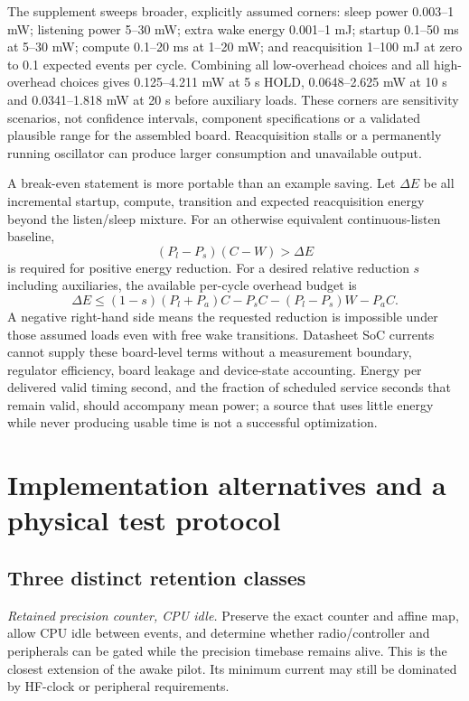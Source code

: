 \documentclass[11pt,letterpaper]{article}
\begin{document}
The supplement sweeps broader, explicitly assumed corners: sleep power 0.003--1 mW; listening power 5--30 mW; extra wake energy 0.001--1 mJ; startup 0.1--50 ms at 5--30 mW; compute 0.1--20 ms at 1--20 mW; and reacquisition 1--100 mJ at zero to 0.1 expected events per cycle. Combining all low-overhead choices and all high-overhead choices gives 0.125--4.211 mW at 5 s HOLD, 0.0648--2.625 mW at 10 s and 0.0341--1.818 mW at 20 s before auxiliary loads. These corners are sensitivity scenarios, not confidence intervals, component specifications or a validated plausible range for the assembled board. Reacquisition stalls or a permanently running oscillator can produce larger consumption and unavailable output.

A break-even statement is more portable than an example saving. Let $\Delta E$ be all incremental startup, compute, transition and expected reacquisition energy beyond the listen/sleep mixture. For an otherwise equivalent continuous-listen baseline,
\begin{equation}
 (P_l-P_s)(C-W)>\Delta E\label{eq:break}
\end{equation}
is required for positive energy reduction. For a desired relative reduction $s$ including auxiliaries, the available per-cycle overhead budget is
\begin{equation}
 \Delta E\le (1-s)(P_l+P_a)C-P_sC-(P_l-P_s)W-P_aC.\label{eq:budgetenergy}
\end{equation}
A negative right-hand side means the requested reduction is impossible under those assumed loads even with free wake transitions. Datasheet SoC currents cannot supply these board-level terms without a measurement boundary, regulator efficiency, board leakage and device-state accounting. Energy per delivered valid timing second, and the fraction of scheduled service seconds that remain valid, should accompany mean power; a source that uses little energy while never producing usable time is not a successful optimization.

\section{Implementation alternatives and a physical test protocol}\label{sec:future}
\subsection{Three distinct retention classes}
\emph{Retained precision counter, CPU idle.} Preserve the exact counter and affine map, allow CPU idle between events, and determine whether radio/controller and peripherals can be gated while the precision timebase remains alive. This is the closest extension of the awake pilot. Its minimum current may still be dominated by HF-clock or peripheral requirements.
\end{document}
